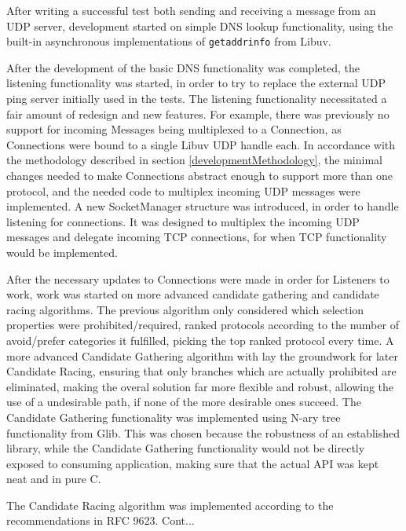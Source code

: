 After writing a successful test both sending
and receiving a message from an UDP server, development started on simple DNS
lookup functionality, using the built-in asynchronous implementations of
\texttt{getaddrinfo} from Libuv.

After the development of the basic DNS functionality was completed, 
the listening functionality was started, in order to try to replace
the external UDP ping server initially used in the tests. The listening
functionality necessitated a fair amount of redesign and new features.
For example, there was previously no support for incoming Messages being
multiplexed to a Connection, as Connections were bound to a single
Libuv UDP handle each. In accordance with the methodology described in
section \ref{developmentMethodology}, the minimal changes needed to
make Connections abstract enough to support more than one protocol,
and the needed code to multiplex incoming UDP messages were implemented.
A new SocketManager structure was introduced, in order to handle listening
for connections. It was designed to multiplex the incoming UDP messages
and delegate incoming TCP connections, for when TCP functionality would
be implemented.

After the necessary updates to Connections were made in order
for Listeners to work, work was started on more advanced candidate
gathering and candidate racing algorithms. The previous algorithm
only considered which selection properties were prohibited/required,
ranked protocols according to the number of avoid/prefer categories
it fulfilled, picking the top ranked protocol every time. A more advanced
Candidate Gathering algorithm with lay the groundwork for later Candidate
Racing, ensuring that only branches which are actually prohibited are
eliminated, making the overal solution far more flexible and robust,
allowing the use of a undesirable path, if none of the more desirable
ones succeed. The Candidate Gathering functionality was implemented using
N-ary tree functionality from Glib. This was chosen because the robustness
of an established library, while the Candidate Gathering functionality would
not be directly exposed to consuming application, making sure that the
actual API was kept neat and in pure C.

The Candidate Racing algorithm was implemented according to the recommendations
in RFC 9623. Cont...
